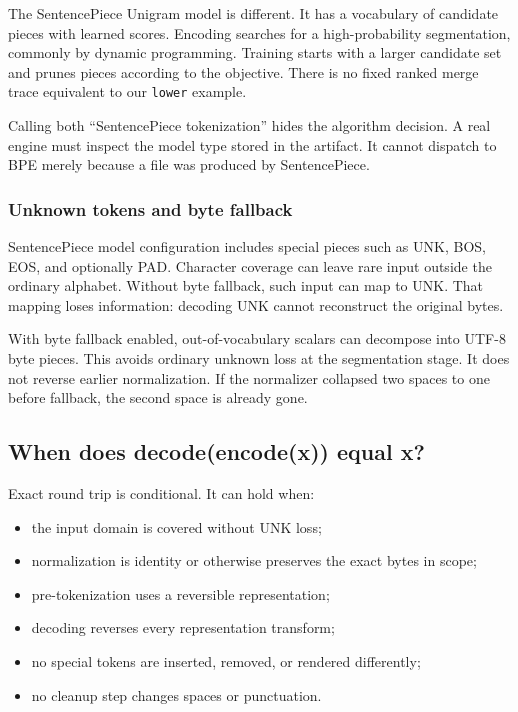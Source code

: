 \documentclass[
  10pt,
]{article}
\providecommand{\tightlist}{%
  \setlength{\itemsep}{0pt}\setlength{\parskip}{0pt}}
\begin{document}
The SentencePiece Unigram model is different. It has a vocabulary of
candidate pieces with learned scores. Encoding searches for a
high-probability segmentation, commonly by dynamic programming. Training
starts with a larger candidate set and prunes pieces according to the
objective. There is no fixed ranked merge trace equivalent to our
\texttt{lower} example.

Calling both ``SentencePiece tokenization'' hides the algorithm
decision. A real engine must inspect the model type stored in the
artifact. It cannot dispatch to BPE merely because a file was produced
by SentencePiece.

\subsubsection{Unknown tokens and byte
fallback}\label{unknown-tokens-and-byte-fallback}

SentencePiece model configuration includes special pieces such as UNK,
BOS, EOS, and optionally PAD. Character coverage can leave rare input
outside the ordinary alphabet. Without byte fallback, such input can map
to UNK. That mapping loses information: decoding UNK cannot reconstruct
the original bytes.

With byte fallback enabled, out-of-vocabulary scalars can decompose into
UTF-8 byte pieces. This avoids ordinary unknown loss at the segmentation
stage. It does not reverse earlier normalization. If the normalizer
collapsed two spaces to one before fallback, the second space is already
gone.

\subsection{When does decode(encode(x)) equal
x?}\label{when-does-decodeencodex-equal-x}

Exact round trip is conditional. It can hold when:

\begin{itemize}
\tightlist
\item
  the input domain is covered without UNK loss;
\item
  normalization is identity or otherwise preserves the exact bytes in
  scope;
\item
  pre-tokenization uses a reversible representation;
\item
  decoding reverses every representation transform;
\item
  no special tokens are inserted, removed, or rendered differently;
\item
  no cleanup step changes spaces or punctuation.
\end{itemize}
\end{document}
